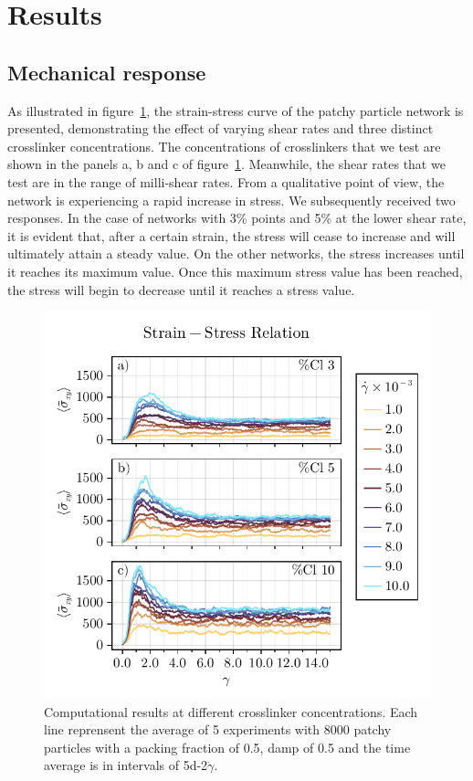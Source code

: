 \section{Results}

\subsection{Mechanical response}

As illustrated in figure~\ref{fig:stres-strainResults}, the strain-stress curve of the patchy particle network is presented, demonstrating the effect of varying shear rates and three distinct crosslinker concentrations.
The concentrations of crosslinkers that we test are shown in the panels a, b and c of figure~\ref{fig:stres-strainResults}.
Meanwhile, the shear rates that we test are in the range of milli-shear rates.
From a qualitative point of view, the network is experiencing a rapid increase in stress.
We subsequently received two responses.
In the case of networks with 3\% points and 5\% at the lower shear rate, it is evident that, after a certain strain, the stress will cease to increase and will ultimately attain a steady value.
On the other networks, the stress increases until it reaches its maximum value.
Once this maximum stress value has been reached, the stress will begin to decrease until it reaches a stress value.

\begin{figure}[ht!]
    \centering
    \includegraphics[width=\textwidth]{figs/ComputaitonalResults/stress-strain.pdf}
    \caption{Computational results at different crosslinker concentrations. Each line reprensent the average of 5 experiments with \num{8000} patchy particles with a packing fraction of \num{0.5}, damp of \num{0.5} and the time average is in intervals of \num{5d-2}$\dot{\gamma}$.}\label{fig:stres-strainResults}
\end{figure}


